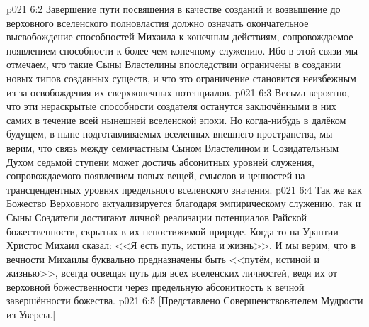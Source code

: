 \vs p021 6:2 Завершение пути посвящения в качестве созданий и возвышение до верховного вселенского полновластия должно означать окончательное высвобождение способностей Михаила к конечным действиям, сопровождаемое появлением способности к более чем конечному служению. Ибо в этой связи мы отмечаем, что такие Сыны Властелины впоследствии ограничены в создании новых типов созданных существ, и что это ограничение становится неизбежным из-за освобождения их сверхконечных потенциалов.
\vs p021 6:3 Весьма вероятно, что эти нераскрытые способности создателя останутся заключёнными в них самих в течение всей нынешней вселенской эпохи. Но когда\hyp{}нибудь в далёком будущем, в ныне подготавливаемых вселенных внешнего пространства, мы верим, что связь между семичастным Сыном Властелином и Созидательным Духом седьмой ступени может достичь абсонитных уровней служения, сопровождаемого появлением новых вещей, смыслов и ценностей на трансцендентных уровнях предельного вселенского значения.
\vs p021 6:4 Так же как Божество Верховного актуализируется благодаря эмпирическому служению, так и Сыны Создатели достигают личной реализации потенциалов Райской божественности, скрытых в их непостижимой природе. Когда\hyp{}то на Урантии Христос Михаил сказал: <<Я есть путь, истина и жизнь>>. И мы верим, что в вечности Михаилы буквально предназначены быть <<путём, истиной и жизнью>>, всегда освещая путь для всех вселенских личностей, ведя их от верховной божественности через предельную абсонитность к вечной завершённости божества.
\vsetoff
\vs p021 6:5 [Представлено Совершенствователем Мудрости из Уверсы.]
\quizlink
